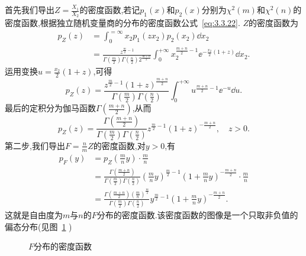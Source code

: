 首先我们导出$Z=\frac{X_1}{X_2}$的密度函数,若记$p_1(x)$和$p_2(x)$分别为$\chi^2(m)$和$\chi^2(n)$的密度函数,根据独立随机变量商的分布的密度函数公式~\eqref{eq:3.3.22}. $Z$的密度函数为
\begin{align*}
p_Z(z)&=\int_0^{=\infty}x_2p_1(zx_2)p_2(x_2)\dd x_2\\
&=\frac{z^{\frac{m}{2}-1}}{\Gamma \left( \frac{m}{2} \right) \Gamma \left( \frac{n}{2} \right) 2^{\frac{m+n}{2}}}\int_0^{+\infty}x_2^{\frac{m+n}2-1}\ee^{-\frac{x_2}2(1+z)}\dd x_2.
\end{align*}
运用变换$u=\frac{x_2}2(1+z)$,可得
\[p_Z(z)=\frac{z^{\frac{m}{2}-1}\left( 1+z \right) ^{\frac{m+n}{2}}}{\Gamma \left( \frac{m}{2} \right) \Gamma \left( \frac{n}{2} \right)}\int_0^{+\infty}u^{\frac{m+n}2-1}\ee^{-u}\dd u.\]
最后的定积分为伽马函数$\Gamma\left(\frac{m+n}2\right)$,从而
\[
p_Z\left( z \right) =\frac{\Gamma \left( \frac{m+n}{2} \right)}{\Gamma \left( \frac{m}{2} \right) \Gamma \left( \frac{n}{2} \right)}z^{\frac{m}{2}-1}\left( 1+z \right) ^{-\frac{m+n}{2}},\quad z>0.
\]
第二步,我们导出$F=\frac nm Z$的密度函数,对$y>0$,有
\begin{align*}
p_F\left( y \right) &=p_Z\left( \frac{m}{n}y \right) \cdot \frac{m}{n}\\
&=\frac{\Gamma \left( \frac{m+n}{2} \right)}{\Gamma \left( \frac{m}{2} \right) \Gamma \left( \frac{n}{2} \right)}\left( \frac{m}{n}y \right) ^{\frac{m}{2}-1}\left( 1+\frac{m}{n}y \right) ^{-\frac{m+n}{2}}\cdot \frac{m}{n}\\
&=\frac{\Gamma \left( \frac{m+n}{2} \right) \left( \frac{m}{n} \right) ^{\frac{m}{2}}}{\Gamma \left( \frac{m}{2} \right) \Gamma \left( \frac{n}{2} \right)}y^{\frac{m}{2}-1}\left( 1+\frac{m}{n}y \right) ^{-\frac{m+n}{2}}.
\end{align*}
这就是自由度为$m$与$n$的$F$分布的密度函数.该密度函数的图像是一个只取非负值的偏态分布(见图~\ref{fig:5.4.2} )
\begin{figure}
  \centering
{}
  \caption{$F$分布的密度函数}\label{fig:5.4.2}
\end{figure}

